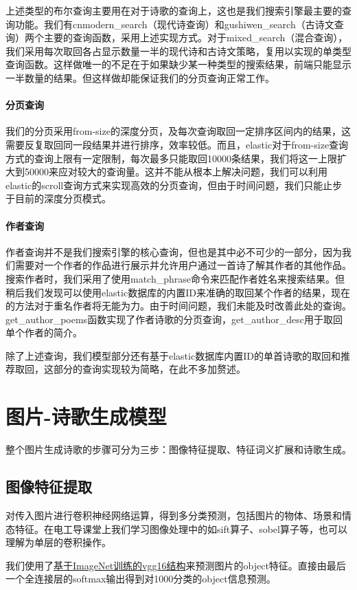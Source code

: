\documentclass[a4paper, 10pt]{article}
\begin{document}
上述类型的布尔查询主要用在对于诗歌的查询上，这也是我们搜索引擎最主要的查询功能。我们有cnmodern\_search（现代诗查询）和gushiwen\_search（古诗文查询）两个主要的查询函数，采用上述实现方式。对于mixed\_search（混合查询），我们采用每次取回各占显示数量一半的现代诗和古诗文策略，复用以实现的单类型查询函数。这样做唯一的不足在于如果缺少某一种类型的搜索结果，前端只能显示一半数量的结果。但这样做却能保证我们的分页查询正常工作。

\paragraph*{分页查询} 我们的分页采用from-size的深度分页，及每次查询取回一定排序区间内的结果，这需要反复取回同一段结果并进行排序，效率较低。而且，elastic对于from-size查询方式的查询上限有一定限制，每次最多只能取回10000条结果，我们将这一上限扩大到50000来应对较大的查询量。这并不能从根本上解决问题，我们可以利用elastic的scroll查询方式来实现高效的分页查询，但由于时间问题，我们只能止步于目前的深度分页模式。

\paragraph*{作者查询} 作者查询并不是我们搜索引擎的核心查询，但也是其中必不可少的一部分，因为我们需要对一个作者的作品进行展示并允许用户通过一首诗了解其作者的其他作品。搜索作者时，我们采用了使用match\_phrase命令来匹配作者姓名来搜索结果。但稍后我们发现可以使用elastic数据库的内置ID来准确的取回某个作者的结果，现在的方法对于重名作者将无能为力。由于时间问题，我们未能及时改善此处的查询。get\_author\_poems函数实现了作者诗歌的分页查询，get\_author\_desc用于取回单个作者的简介。

除了上述查询，我们模型部分还有基于elastic数据库内置ID的单首诗歌的取回和推荐取回，这部分的查询实现较为简略，在此不多加赘述。


\section{图片-诗歌生成模型}
整个图片生成诗歌的步骤可分为三步：图像特征提取、特征词义扩展和诗歌生成。

\subsection{图像特征提取}
对传入图片进行卷积神经网络运算，得到多分类预测，包括图片的物体、场景和情态特征。在电工导课堂上我们学习图像处理中的如sift算子、sobel算子等，也可以理解为单层的卷积操作。

我们使用了\href{http://www.cs.toronto.edu/~frossard/post/vgg16/}{基于ImageNet训练的vgg16结构}来预测图片的object特征。直接由最后一个全连接层的softmax输出得到对1000分类的object信息预测。
\end{document}
